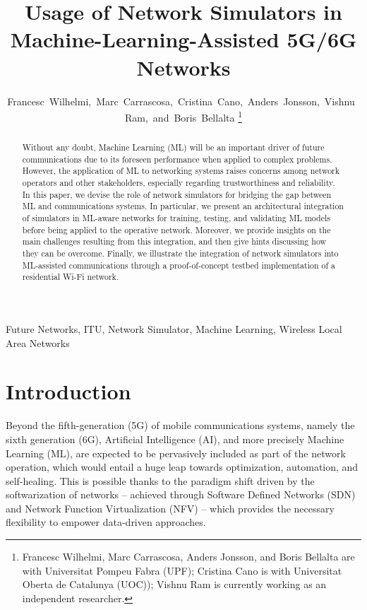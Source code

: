 \documentclass[journal]{IEEEtran}
\begin{document}
	\title{Usage of Network Simulators in \\Machine-Learning-Assisted 5G/6G Networks}
	
	\author{Francesc~Wilhelmi,~Marc~Carrascosa,~Cristina~Cano,~Anders~Jonsson,~Vishnu~Ram,~and~Boris~Bellalta%
		\thanks{Francesc Wilhelmi, Marc Carrascosa, Anders Jonsson, and Boris Bellalta are with Universitat Pompeu Fabra (UPF); Cristina Cano is with Universitat Oberta de Catalunya (UOC)); Vishnu Ram is currently working as an independent researcher.}%
	}
	
	\maketitle
	
	\begin{abstract}
		Without any doubt, Machine Learning (ML) will be an important driver of future communications due to its foreseen performance when applied to complex problems. However, the application of ML to networking systems raises concerns among network operators and other stakeholders, especially regarding trustworthiness and reliability. In this paper, we devise the role of network simulators for bridging the gap between ML and communications systems. In particular, we present an architectural integration of simulators in ML-aware networks for training, testing, and validating ML models before being applied to the operative network. Moreover, we provide insights on the main challenges resulting from this integration, and then give hints discussing how they can be overcome. Finally, we illustrate the integration of network simulators into ML-assisted communications through a proof-of-concept testbed implementation of a residential Wi-Fi network. 
	\end{abstract}
	
	\begin{IEEEkeywords}
		Future Networks, ITU, Network Simulator, Machine Learning, Wireless Local Area Networks
	\end{IEEEkeywords}
	
	\IEEEpeerreviewmaketitle
	
	\section{Introduction}
	
	Beyond the fifth-generation (5G) of mobile communications systems, namely the sixth generation (6G), Artificial Intelligence (AI), and more precisely Machine Learning (ML), are expected to be pervasively included as part of the network operation, which would entail a huge leap towards optimization, automation, and self-healing. This is possible thanks to the paradigm shift driven by the softwarization of networks -- achieved through Software Defined Networks (SDN) and Network Function Virtualization (NFV) -- which provides the necessary flexibility to empower data-driven approaches.
	
\end{document}
